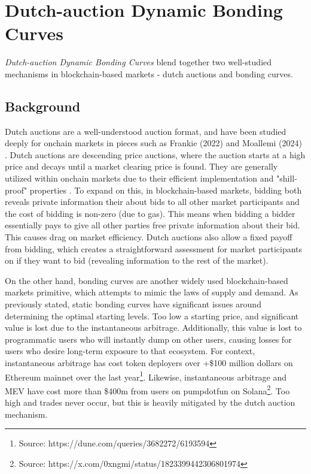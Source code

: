 \documentclass[sigconf,nonacm,prologue,table]{acmart}
\numberwithin{equation}{section}
\theoremstyle{definition}
\theoremstyle{remark}
\begin{document}
\section{Dutch-auction Dynamic Bonding Curves} 
\label{sec:bonding}

\emph{Dutch-auction Dynamic Bonding Curves} blend together two well-studied mechanisms in blockchain-based markets - dutch auctions and bonding curves. 

\subsection{Background}

Dutch auctions are a well-understood auction format, and have been studied deeply for onchain markets in pieces such as Frankie (2022) \cite{frankie2022gda} and Moallemi (2024) \cite{moallemi2024loss}. Dutch auctions are descending price auctions, where the auction starts at a high price and decays until a market clearing price is found. They are generally utilized within onchain markets due to their efficient implementation and "shill-proof" properties \cite{komo2024shillproofauctions}. To expand on this, in blockchain-based markets, bidding both reveals private information their about bids to all other market participants and the cost of bidding is non-zero (due to gas). This means when bidding a bidder essentially pays to give all other parties free private information about their bid. This causes drag on market efficiency. Dutch auctions also allow a fixed payoff from bidding, which creates a straightforward assessment for market participants on if they want to bid (revealing information to the rest of the market). 

On the other hand, bonding curves are another widely used blockchain-based markets primitive, which attempts to mimic the laws of supply and demand. As previously stated, static bonding curves have significant issues around determining the optimal starting levels. Too low a starting price, and significant value is lost due to the instantaneous arbitrage. Additionally, this value is lost to programmatic users who will instantly dump on other users, causing losses for users who desire long-term exposure to that ecosystem. For context, instantaneous arbitrage has cost token deployers over +\$100 million dollars on Ethereum mainnet over the last year\footnote{Source: https://dune.com/queries/3682272/6193594}. Likewise, instantaneous arbitrage and MEV have cost more than \$400m from users on pumpdotfun on Solana\footnote{Source: https://x.com/0xngmi/status/1823399442306801974}. 
Too high and trades never occur, but this is heavily mitigated by the dutch auction mechanism.
\end{document}
